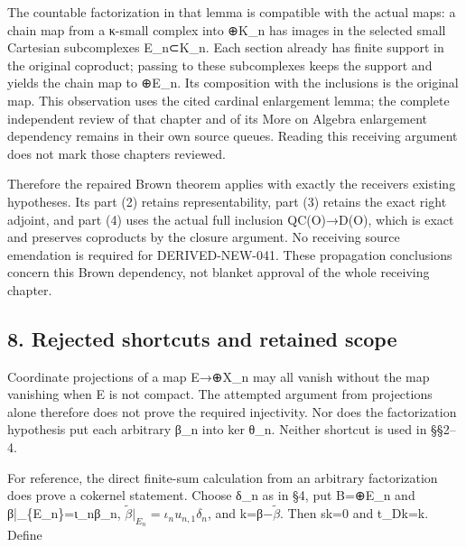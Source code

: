The countable factorization in that lemma is compatible with the actual maps:\allowbreak{} a chain map from a κ-small complex into \allowbreak{}⊕K\_\allowbreak{}n has images in the selected small Cartesian subcomplexes E\_\allowbreak{}n⊂K\_\allowbreak{}n. Each section already has finite support in the original coproduct; passing to these subcomplexes keeps the support and yields the chain map to \allowbreak{}⊕E\_\allowbreak{}n. Its composition with the inclusions is the original map. This observation uses the cited cardinal enlargement lemma; the complete independent review of that chapter and of its More on Algebra enlargement dependency remains in their own source queues. Reading this receiving argument does not mark those chapters reviewed.

Therefore the repaired Brown theorem applies with exactly the receiver\textquotesingle s existing hypotheses. Its part (2)\allowbreak{} retains representability,\allowbreak{} part (3)\allowbreak{} retains the exact right adjoint,\allowbreak{} and part (4)\allowbreak{} uses the actual full inclusion QC(O)\allowbreak{}\allowbreak{}→D(O)\allowbreak{},\allowbreak{} which is exact and preserves coproducts by the closure argument. No receiving source emendation is required for DERIVED-NEW-041. These propagation conclusions concern this Brown dependency,\allowbreak{} not blanket approval of the whole receiving chapter.

\subsection{8. Rejected shortcuts and retained scope}\label{proofs-11460-11655-rejected-shortcuts-and-retained-scope}

Coordinate projections of a map E\allowbreak{}→\allowbreak{}⊕X\_\allowbreak{}n may all vanish without the map vanishing when E is not compact. The attempted argument from projections alone therefore does not prove the required injectivity. Nor does the factorization hypothesis put each arbitrary β\_\allowbreak{}n into ker θ\_\allowbreak{}n. Neither shortcut is used in §§2–\allowbreak{}4.

For reference,\allowbreak{} the direct finite-sum calculation from an arbitrary factorization does prove a cokernel statement. Choose δ\_\allowbreak{}n as in §4,\allowbreak{} put B\allowbreak{}=\allowbreak{}⊕E\_\allowbreak{}n and β|\_\allowbreak{}\{E\_\allowbreak{}n\}\allowbreak{}=ι\_\allowbreak{}nβ\_\allowbreak{}n,\allowbreak{} \(\widetilde\beta|_{E_n}=\iota_nu_{n,1}\delta_n\),\allowbreak{} and k\allowbreak{}=β−\(\widetilde\beta\). Then sk\allowbreak{}=0 and t\_\allowbreak{}Dk\allowbreak{}=k. Define

